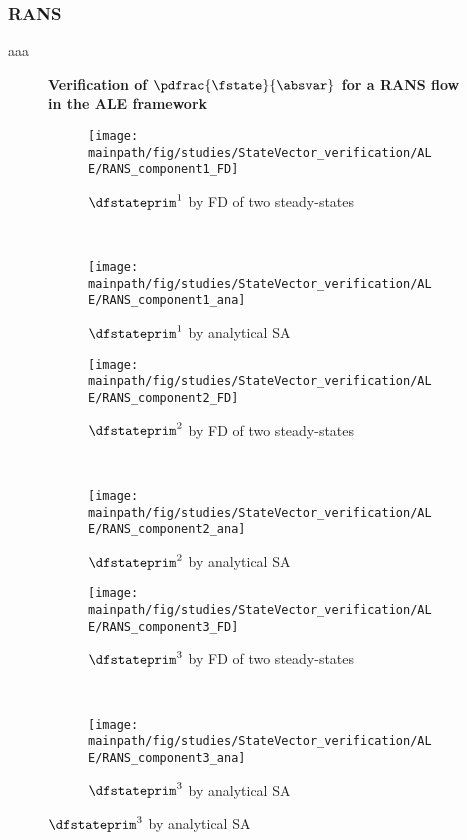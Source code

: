\documentclass[../main.tex]{subfiles}
\begin{document}
\subsubsection{RANS}
aaa
\begin{figure}[t!]
    \centering

    \textbf{Verification of $\pdfrac{\fstate}{\absvar}$ for a RANS flow in the ALE framework}\par\medskip    
    
    \begin{subfigure}[t]{0.5\textwidth}
        \centering
        \texttt{[image: \\mainpath/fig/studies/StateVector\_verification/ALE/RANS\_component1\_FD]}
        \caption{$\dfstateprim^1$ by \ac{FD} of two steady-states}
    \end{subfigure}%
    ~ 
    \begin{subfigure}[t]{0.5\textwidth}
        \centering
        \texttt{[image: \\mainpath/fig/studies/StateVector\_verification/ALE/RANS\_component1\_ana]}
        \caption{$\dfstateprim^1$ by analytical \ac{SA}}
    \end{subfigure}
    
    
    \begin{subfigure}[t]{0.5\textwidth}
        \centering
        \texttt{[image: \\mainpath/fig/studies/StateVector\_verification/ALE/RANS\_component2\_FD]}
        \caption{$\dfstateprim^2$ by \ac{FD} of two steady-states}
    \end{subfigure}%
    ~ 
    \begin{subfigure}[t]{0.5\textwidth}
        \centering
        \texttt{[image: \\mainpath/fig/studies/StateVector\_verification/ALE/RANS\_component2\_ana]}
        \caption{$\dfstateprim^2$ by analytical \ac{SA}}
    \end{subfigure}
    
    
    \begin{subfigure}[t]{0.5\textwidth}
        \centering
        \texttt{[image: \\mainpath/fig/studies/StateVector\_verification/ALE/RANS\_component3\_FD]}
        \caption{$\dfstateprim^3$ by \ac{FD} of two steady-states}
    \end{subfigure}%
    ~ 
    \begin{subfigure}[t]{0.5\textwidth}
        \centering
        \texttt{[image: \\mainpath/fig/studies/StateVector\_verification/ALE/RANS\_component3\_ana]}
        \caption{$\dfstateprim^3$ by analytical \ac{SA}}
    \end{subfigure}
    

\end{figure}
\end{document}
